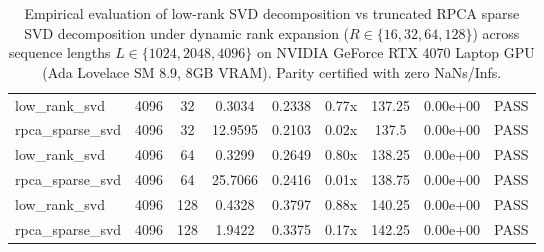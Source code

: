 \documentclass[journal]{IEEEtran}
\begin{document}
\begin{table}[t]
\begin{tabular}{lcccccccc}
low_rank_svd & 4096 & 32 & 0.3034 & 0.2338 & 0.77x & 137.25 & 0.00e+00 & PASS \\
rpca_sparse_svd & 4096 & 32 & 12.9595 & 0.2103 & 0.02x & 137.5 & 0.00e+00 & PASS \\
low_rank_svd & 4096 & 64 & 0.3299 & 0.2649 & 0.80x & 138.25 & 0.00e+00 & PASS \\
rpca_sparse_svd & 4096 & 64 & 25.7066 & 0.2416 & 0.01x & 138.75 & 0.00e+00 & PASS \\
low_rank_svd & 4096 & 128 & 0.4328 & 0.3797 & 0.88x & 140.25 & 0.00e+00 & PASS \\
rpca_sparse_svd & 4096 & 128 & 1.9422 & 0.3375 & 0.17x & 142.25 & 0.00e+00 & PASS \\
\bottomrule
\end{tabular}
\caption{Empirical evaluation of low-rank SVD decomposition vs truncated RPCA sparse SVD decomposition under dynamic rank expansion ($R \in \{16, 32, 64, 128\}$) across sequence lengths $L \in \{1024, 2048, 4096\}$ on NVIDIA GeForce RTX 4070 Laptop GPU (Ada Lovelace SM 8.9, 8GB VRAM). Parity certified with zero NaNs/Infs.}
\label{tab:svd_rpca_rank_scaling}
\end{table}
\end{document}
